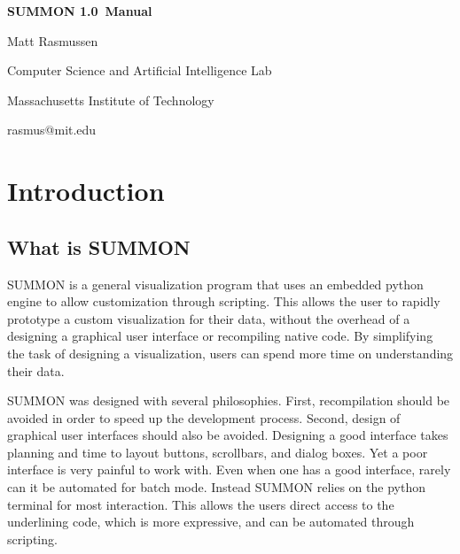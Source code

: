 \documentclass[12pt]{article}
\newcommand{\version}{1.0}
\begin{document}
\begin{titlepage}

\begin{center}

\vspace*{2.5in}

{\huge \bf {}\selectfont 
SUMMON \version\ Manual
}
\vspace*{.5in}

{\large
Matt Rasmussen
}
\vspace*{.5in}

Computer Science and Artificial Intelligence Lab

Massachusetts Institute of Technology

\vspace*{.25in}

rasmus@mit.edu
\end{center}

\end{titlepage}


\tableofcontents

\clearpage

\section{Introduction}
\label{sec:intro}


\subsection{What is SUMMON}

SUMMON is a general visualization program that uses an embedded python engine to
allow customization through scripting.  This allows the user to rapidly
prototype a custom visualization for their data, without the overhead of a
designing a graphical user interface or recompiling native code.  By simplifying
the task of designing a visualization, users can spend more time on
understanding their data. 

SUMMON was designed with several philosophies.  First, recompilation should
be avoided in order to speed up the development process.  Second, design of
graphical user interfaces should also be avoided.  Designing a good interface
takes planning and time to layout buttons, scrollbars, and dialog boxes.  Yet a 
poor interface is very painful to work with. Even when one has a good interface,
rarely can it be automated for batch mode.  Instead SUMMON relies on the
python terminal for most interaction.  This allows the users direct access to the
underlining code, which is more expressive, and can be automated through
scripting.  
\end{document}
